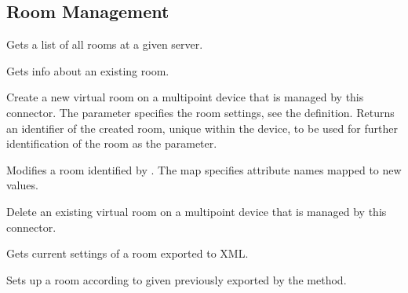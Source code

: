 \subsection{Room Management}
\begin{Api}

Gets a list of all rooms at a given server.

Gets info about an existing room.

Create a new virtual room on a multipoint device that is managed by this connector. The  parameter specifies the room settings, see the  definition. Returns an identifier of the created room, unique within the device, to be used for further identification of the room as the  parameter.

Modifies a room identified by . The  map specifies  attribute names mapped to new values.

Delete an existing virtual room on a multipoint device that is managed by this connector.

Gets current settings of a room exported to XML.
\\

Sets up a room according to given  previously exported by the  method.

\end{Api}


